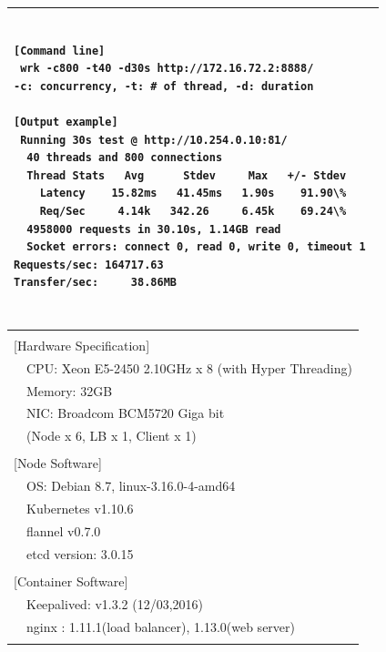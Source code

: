 \begin{table}[]
  \centering
  \begin{tabular}{l}
    \hline
    \begin{minipage}{12cm}
      \begin{verbatim}

[Command line] 
 wrk -c800 -t40 -d30s http://172.16.72.2:8888/ 
-c: concurrency, -t: # of thread, -d: duration 

[Output example] 
 Running 30s test @ http://10.254.0.10:81/ 
  40 threads and 800 connections 
  Thread Stats   Avg      Stdev     Max   +/- Stdev 
    Latency    15.82ms   41.45ms   1.90s    91.90\% 
    Req/Sec     4.14k   342.26     6.45k    69.24\% 
  4958000 requests in 30.10s, 1.14GB read 
  Socket errors: connect 0, read 0, write 0, timeout 1 
Requests/sec: 164717.63 
Transfer/sec:     38.86MB 
      \end{verbatim}
    \end{minipage}
   \\ \hline
  \end{tabular}
  \caption{}
  \label{tab:bench_example}
\end{table}

\begin{table}[]
  \centering
  \begin{tabular}{ll}
    \hline \\
    \multicolumn{2}{l}{[Hardware Specification]}   \\
    & CPU: Xeon E5-2450 2.10GHz x 8 (with Hyper Threading) \\
    & Memory: 32GB \\
    & NIC: Broadcom BCM5720 Giga bit \\
    & (Node x 6, LB x 1, Client x 1) \\
    & \\
    \multicolumn{2}{l}{[Node Software]}  \\
    & OS: Debian 8.7, linux-3.16.0-4-amd64 \\
    & Kubernetes v1.10.6 \\
    & flannel v0.7.0 \\
    & etcd version: 3.0.15 \\
    & \\
    \multicolumn{2}{l}{[Container Software]}   \\
    & Keepalived: v1.3.2 (12/03,2016) \\
    & nginx : 1.11.1(load balancer), 1.13.0(web server) \\
    \\ \hline
  \end{tabular}
  \caption{}
  \label{tab:hw_sw_spec}
\end{table}


